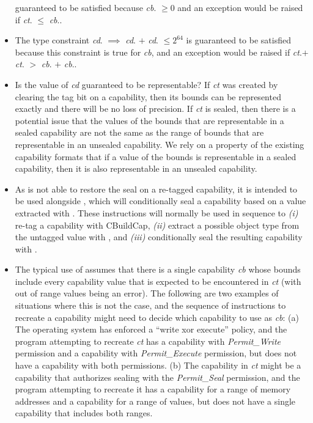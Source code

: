 \begin{itemize}
guaranteed to be satisfied
because \emph{cb}.\cbase{} $\ge 0$ and an exception would be raised if
\emph{ct}.\cbase{} $\le$ \emph{cb}.\cbase{}.
\item
The type constraint \emph{cd}.\ctag{} $\implies$ \emph{cd}.\cbase{} $+$
\emph{cd}.\clength{} $\le 2^{64}$ is guaranteed to be satisfied because this
constraint is true for \emph{cb}, and an exception would be raised if
\emph{ct}.\cbase $+$ \emph{ct}.\clength{} $>$ \emph{cb}.\cbase{} $+$
\emph{cb}.\clength{}.
\item
Is the value of \emph{cd} guaranteed to be representable?
If \emph{ct} was created by clearing the tag bit on a capability, then its
bounds can be represented exactly and there will be no loss of precision.
If \emph{ct} is sealed, then there is a potential issue that the values
of the bounds that are representable in a sealed capability are not the same as
the range of bounds that are representable in an unsealed capability. We rely
on a property of the existing capability formats that if a value of the bounds
is representable in a sealed capability, then it is also representable in an
unsealed capability.
\item As  is not able to restore the seal on a
re-tagged capability, it is intended to be used alongside
, which will conditionally seal a capability based on a \cotype{} value
extracted with .
These instructions will normally be used in sequence to \textit{(i)} re-tag a
capability with CBuildCap, \textit{(ii)} extract a possible object type from
the untagged value with , and \textit{(iii)}
conditionally seal the resulting capability with .
\item
The typical use of  assumes that there is a single
capability \emph{cb} whose bounds include every capability value that is
expected to be encountered in \emph{ct} (with out of range values being an
error). The following are two examples of situations where this is not the
case, and the sequence of instructions to recreate a capability might need
to decide which capability to use as \emph{cb}:
(a) The operating system has enforced a ``write xor execute'' policy, and
the program attempting to recreate \emph{ct} has a capability with
\emph{Permit\_Write} permission and a capability with \emph{Permit\_Execute}
permission, but does not have a capability with both permissions.
(b) The capability in \emph{ct} might be a capability that authorizes sealing
with the \emph{Permit\_Seal} permission, and the program attempting to
recreate it has a capability for a range of memory addresses and a capability
for a range of \cotype{} values, but does not have a single capability that
includes both ranges.
\end{itemize}

